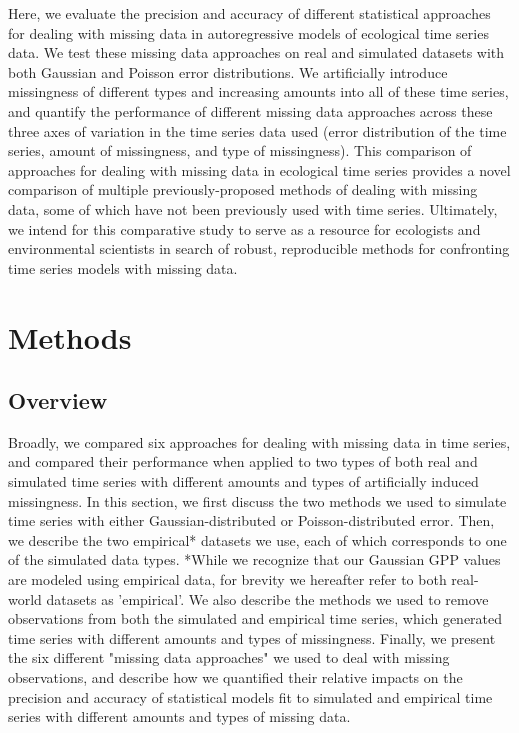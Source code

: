 \documentclass{article}
\begin{document}
Here, we evaluate the precision and accuracy of different statistical approaches for dealing with missing data in autoregressive models of ecological time series data. We test these missing data approaches on real and simulated datasets with both Gaussian and Poisson error distributions. We artificially introduce missingness of different types and increasing amounts into all of these time series, and quantify the performance of different missing data approaches across these three axes of variation in the time series data used (error distribution of the time series, amount of missingness, and type of missingness). This comparison of approaches for dealing with missing data in ecological time series provides a novel comparison of multiple previously-proposed methods of dealing with missing data, some of which have not been previously used with time series. Ultimately, we intend for this comparative study to serve as a resource for ecologists and environmental scientists in search of robust, reproducible methods for confronting time series models with missing data.

\section*{Methods} 

\subsection*{Overview}


Broadly, we compared six approaches for dealing with missing data in time series, and compared their performance when applied to two types of both real and simulated time series with different amounts and types of artificially induced missingness. %
In this section, we first discuss the two methods we used to simulate time series with either Gaussian-distributed or Poisson-distributed error. Then, we describe the two empirical* datasets we use, each of which corresponds to one of the simulated data types. *While we recognize that our Gaussian GPP values are modeled using empirical data, for brevity we hereafter refer to both real-world datasets as 'empirical'. We also describe the methods we used to remove observations from both the simulated and empirical time series, which generated time series with different amounts and types of missingness. Finally, we present the six different "missing data approaches" we used to deal with missing observations, and describe how we quantified their relative impacts on the precision and accuracy of statistical models fit to simulated and empirical time series with different amounts and types of missing data.   
\end{document}
